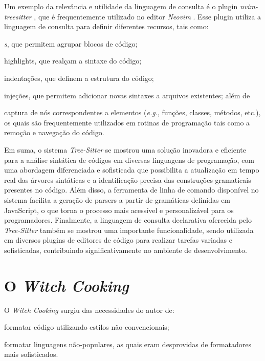 \documentclass[11pt, a4paper, english, openright, twoside, brazil]{abntex2}
\begin{document}
  Um exemplo da relevância e utilidade da linguagem de consulta é o plugin
  \textit{nvim-treesitter} \cite{nvim-treesitter-2023-nvim}, que é
  frequentemente utilizado no editor \textit{Neovim}
  \cite{neovim-2014-hyperextensible}. Esse plugin utiliza a linguagem de
  consulta para definir diferentes recursos, tais como:
  \begin{inparaenum}
    \item \textit{s}, que permitem agrupar blocos de código;
    \item highlights, que realçam a sintaxe do código;
    \item indentações, que definem a estrutura do código;
    \item injeções, que permitem adicionar novas sintaxes a arquivos
          existentes; além de
    \item captura de nós correspondentes a elementos (\textit{e.g.}, funções,
          classes, métodos, etc.), os quais são frequentemente utilizados em
          rotinas de programação tais como a remoção e navegação do código.
  \end{inparaenum}

  Em suma, o sistema \textit{Tree-Sitter} se mostrou uma solução inovadora e
  eficiente para a análise sintática de códigos em diversas linguagens de
  programação, com uma abordagem diferenciada e sofisticada que possibilita a
  atualização em tempo real das árvores sintáticas e a identificação precisa
  das construções gramaticais presentes no código. Além disso, a ferramenta de
  linha de comando disponível no sistema facilita a geração de parsers a partir
  de gramáticas definidas em JavaScript, o que torna o processo mais acessível
  e personalizável para os programadores. Finalmente, a linguagem de consulta
  declarativa oferecida pelo \textit{Tree-Sitter} também se mostrou uma
  importante funcionalidade, sendo utilizada em diversos plugins de editores de
  código para realizar tarefas variadas e sofisticadas, contribuindo
  significativamente no ambiente de desenvolvimento.


  \chapter{O \textit{Witch Cooking}}

  O \textit{Witch Cooking} surgiu das necessidades do autor de:
  \begin{inparaenum}
    \item formatar código utilizando estilos não convencionais;
    \item formatar linguagens não-populares, as quais eram desprovidas de
          formatadores mais sofisticados.
  \end{inparaenum}


  \postextual
  \printbibliography
\end{document}
